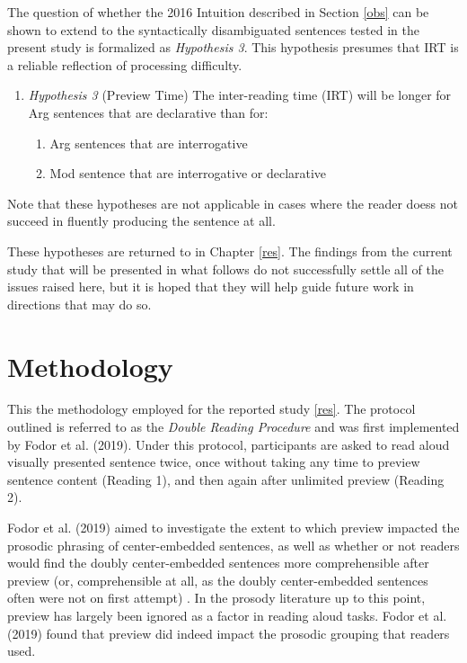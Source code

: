 \documentclass[12pt,oneside]{book}
\providecommand{\tightlist}{%
  \setlength{\itemsep}{0pt}\setlength{\parskip}{0pt}}
\begin{document}
The question of whether the 2016 Intuition described in Section \ref{obs} can be shown to extend to the syntactically disambiguated sentences tested in the present study is formalized as \emph{Hypothesis 3}. This hypothesis presumes that IRT is a reliable reflection of processing difficulty.

\begin{enumerate}
\def\labelenumi{(\arabic{enumi})}
\setcounter{enumi}{28}
\tightlist
\item
  \emph{Hypothesis 3} (Preview Time) \linebreak\nopagebreak
  The inter-reading time (IRT) will be longer for Arg sentences that are declarative than for:

  \begin{enumerate}
  \def\labelenumii{\alph{enumii}.}
  \tightlist
  \item
    Arg sentences that are interrogative
  \item
    Mod sentence that are interrogative or declarative
  \end{enumerate}
\end{enumerate}

Note that these hypotheses are not applicable in cases where the reader doess not succeed in fluently producing the sentence at all.

These hypotheses are returned to in Chapter \ref{res}. The findings from the current study that will be presented in what follows do not successfully settle all of the issues raised here, but it is hoped that they will help guide future work in directions that may do so.

\hypertarget{method}{%
\chapter{Methodology}\label{method}}

This  the methodology employed for the reported study  \ref{res}. The protocol outlined is referred to as the \emph{Double Reading Procedure} and was first implemented by Fodor et al. (2019). Under this protocol, participants are asked to read aloud  visually presented sentence twice, once without taking any time to preview sentence content (Reading 1), and then again after unlimited preview (Reading 2).

Fodor et al. (2019) aimed to investigate the extent to which preview impacted the prosodic phrasing of center-embedded sentences, as well as whether or not readers would find the doubly center-embedded sentences more comprehensible after preview (or, comprehensible at all, as the doubly center-embedded sentences often were not on first attempt) . In the prosody literature up to this point, preview has largely been ignored as a factor in reading aloud tasks. Fodor et al. (2019) found that preview did indeed impact  the prosodic grouping that readers used.
\end{document}
